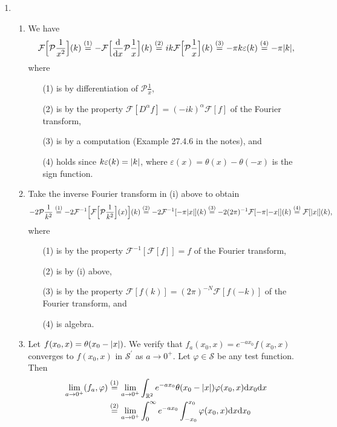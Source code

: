 \documentclass[11pt]{article}
\newcommand{\eq}[1]{\overset{(#1)}{=}}
\begin{document}
\begin{enumerate}
    \item\begin{enumerate}[label=(\roman*)]
        \item We have
        \[\mathcal F\Big[\mathcal P\frac{1}{x^2}\Big](k) \eq{1} - \mathcal F\Big[\dv{x}\mathcal P\frac{1}{x}\Big](k) \eq{2} ik\mathcal F\Big[\mathcal P \frac{1}{x}\Big](k) \eq{3} -\pi k\varepsilon(k) \eq{4} -\pi\abs{k},\] where \begin{enumerate}
            \item[(1)] is by differentiation of $\mathcal P\frac{1}{x}$, 
            \item[(2)] is by the property $\mathcal F[D^\alpha f] = (-ik)^\alpha\mathcal F[f]$ of the Fourier transform,
            \item[(3)] is by a computation (Example 27.4.6 in the notes), and
            \item[(4)] holds since $k\varepsilon(k) = \abs{k}$, where $\varepsilon(x) = \theta(x)-\theta(-x)$ is the sign function.
        \end{enumerate}
        \item Take the inverse Fourier transform in (i) above to obtain
        \[-2\mathcal P \frac{1}{k^2} \eq{1} -2\mathcal F^{-1}\Big[\mathcal F\Big[\mathcal P\frac{1}{k^2}\Big](x)\Big](k) \eq{2} -2\mathcal F^{-1}[-\pi\abs{x}](k) \eq{3} -2(2\pi)^{-1}\mathcal F[-\pi\abs{-x}](k) \eq{4} \mathcal{F}[\abs{x}](k),\] where \begin{enumerate}
            \item[(1)] is by the property $\mathcal F^{-1}[\mathcal F[f]] = f$ of the Fourier transform,
            \item[(2)] is by (i) above,
            \item[(3)] is by the property $\mathcal F[f(k)] = (2\pi)^{-N}\mathcal F[f(-k)]$ of the Fourier transform, and
            \item[(4)] is algebra.
        \end{enumerate}
        \item Let $f(x_0,x) = \theta(x_0-\abs{x})$. We verify that $f_a(x_0,x) = e^{-ax_0}f(x_0,x)$ converges to $f(x_0,x)$ in $\mathcal S^\prime$ as $a\to 0^+$. Let $\varphi\in \mathcal S$ be any test function. Then 
        \begin{align*}
            \lim_{a\to0^+}(f_a,\varphi) &\eq{1} \lim_{a\to0^+}\int_{\mathbb R^2}e^{-ax_0}\theta(x_0-\abs{x})\varphi(x_0,x)\dd x_0\dd x\\
            &\eq{2} \lim_{a\to0^+}\int_0^\infty e^{-ax_0}\int_{-x_0}^{x_0}\varphi(x_0,x)\dd x\dd x_0\\

\end{align*}
\end{enumerate}
\end{enumerate}
\end{document}
